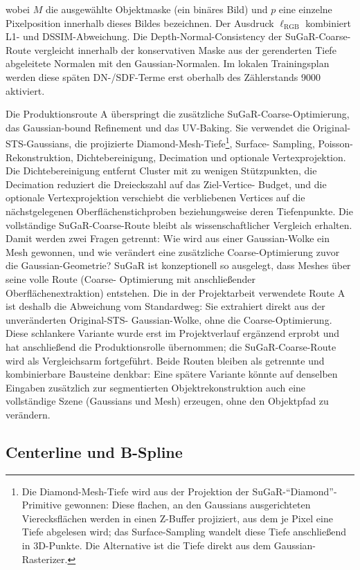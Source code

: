 wobei $M$ die ausgewählte Objektmaske (ein binäres Bild) und $p$ eine einzelne
Pixelposition innerhalb dieses Bildes bezeichnen. Der Ausdruck
$\ell_{\mathrm{RGB}}$ kombiniert L1- und DSSIM-Abweichung. Die
Depth-Normal-Consistency der
SuGaR-Coarse-Route vergleicht innerhalb der konservativen Maske aus der
gerenderten Tiefe abgeleitete Normalen mit den Gaussian-Normalen. Im lokalen
Trainingsplan werden diese späten DN-/SDF-Terme erst oberhalb des Zählerstands
9000 aktiviert.

Die Produktionsroute A überspringt die zusätzliche SuGaR-Coarse-Optimierung,
das Gaussian-bound Refinement und das UV-Baking. Sie verwendet die
Original-STS-Gaussians, die projizierte Diamond-Mesh-Tiefe\footnote{Die
Diamond-Mesh-Tiefe wird aus der Projektion der SuGaR-``Diamond''-Primitive
gewonnen: Diese flachen, an den Gaussians ausgerichteten Vierecksflächen
werden in einen Z-Buffer projiziert, aus dem je Pixel eine Tiefe abgelesen
wird; das Surface-Sampling wandelt diese Tiefe anschließend in 3D-Punkte. Die
Alternative ist die Tiefe direkt aus dem Gaussian-Rasterizer.}, Surface-
Sampling, Poisson-Rekonstruktion, Dichtebereinigung, Decimation und optionale
Vertexprojektion. Die Dichtebereinigung entfernt Cluster mit zu wenigen
Stützpunkten, die Decimation reduziert die Dreieckszahl auf das Ziel-Vertice-
Budget, und die optionale Vertexprojektion verschiebt die verbliebenen
Vertices auf die nächstgelegenen Oberflächenstichproben beziehungsweise deren
Tiefenpunkte. Die vollständige SuGaR-Coarse-Route bleibt als
wissenschaftlicher Vergleich erhalten. Damit werden zwei Fragen getrennt:
Wie wird aus einer Gaussian-Wolke ein Mesh gewonnen, und wie verändert eine
zusätzliche Coarse-Optimierung zuvor die Gaussian-Geometrie? SuGaR ist
konzeptionell so ausgelegt, dass Meshes über seine volle Route (Coarse-
Optimierung mit anschließender Oberflächenextraktion) entstehen. Die in der
Projektarbeit verwendete Route A ist deshalb die Abweichung vom
Standardweg: Sie extrahiert direkt aus der unveränderten Original-STS-
Gaussian-Wolke, ohne die Coarse-Optimierung. Diese schlankere Variante wurde
erst im Projektverlauf ergänzend erprobt und hat anschließend die
Produktionsrolle übernommen; die SuGaR-Coarse-Route wird als
Vergleichsarm fortgeführt. Beide Routen bleiben als getrennte und
kombinierbare Bausteine denkbar: Eine spätere Variante könnte auf denselben
Eingaben zusätzlich zur segmentierten Objektrekonstruktion auch eine
vollständige Szene (Gaussians und Mesh) erzeugen, ohne den Objektpfad zu
verändern.

\subsection{Centerline und B-Spline}

